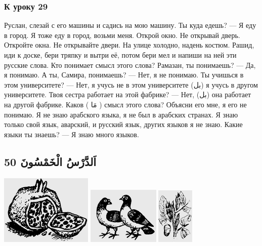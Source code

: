 \documentclass[a5paper]{article}
\begin{document}
\subsubsection{К уроку 29}
Руслан, слезай с его машины и садись на мою машину. Ты куда едешь? — Я еду в город. Я тоже еду в город, возьми меня. Открой окно. Не открывай дверь. Откройте окна. Не открывайте двери. На улице холодно, надень костюм. Рашид, иди к доске, бери тряпку и вытри её, потом бери мел и напиши на ней эти русские слова. Кто понимает смысл этого слова? Рамазан, ты понимаешь? — Да, я понимаю. А ты, Самира, понимаешь? — Нет, я не понимаю. Ты учишься в этом университете? — Нет, я учусь не в этом университете (بل) я учусь в другом университете. Твоя сестра работает на этой фабрике? — Нет, (بل) она работает на другой фабрике. Каков ( مَا ) смысл этого слова? Объясни его мне, я его не понимаю. Я не знаю арабского языка, я не был в арабских странах. Я знаю только свой язык, аварский, и русский язык, других языков я не знаю. Какие языки ты знаешь? — Я знаю много языков.

\subsection[اَلدَّرْسُ الْخَمْسُونَ 50 ]{اَلدَّرْسُ الْخَمْسُونَ 50 }
 \includegraphics[width=1.7291in,height=1.3126in]{images/MuhammadBagauddinprettified-img163.png}   \includegraphics[width=1.3543in,height=1.0728in]{images/MuhammadBagauddinprettified-img164.png}   \includegraphics[width=0.698in,height=1.0626in]{images/MuhammadBagauddinprettified-img165.png} 
\end{document}

